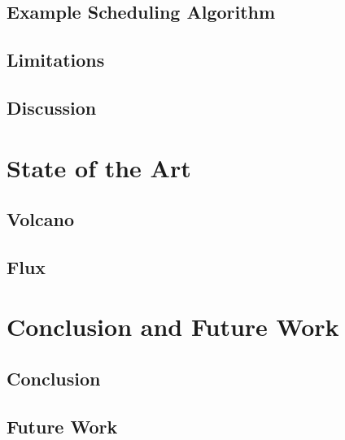 \section{Example Scheduling Algorithm}

\section{Limitations}

\section{Discussion}


\chapter{State of the Art}
\section{Volcano}

\section{Flux}


\chapter{Conclusion and Future Work}
\section{Conclusion}

\section{Future Work}






